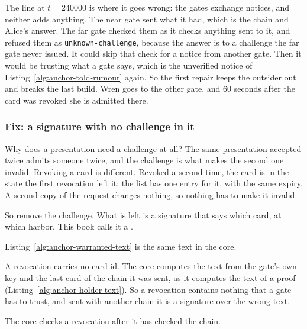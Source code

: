 The line at $t=240000$ is where it goes wrong: the gates exchange notices,
and neither adds anything. The near gate sent what it had, which is
the chain and Alice's answer. The far gate checked them as it checks
anything sent to it, and refused them as \texttt{unknown-challenge},
because the answer is to a challenge the far gate never issued. It could
skip that check for a notice from another gate. Then it would be trusting
what a gate says, which is the unverified notice of
Listing~\ref{alg:anchor-told-rumour} again.
So the first repair keeps the outsider out and breaks the last build. Wren
goes to the other gate, and 60 seconds after the card was revoked she
is admitted there.

\subsubsection{Fix: a signature with no challenge in it}

Why does a presentation need a challenge at all? The same presentation
accepted twice admits someone twice, and the challenge is what makes the
second one invalid. Revoking a card is different. Revoked a second time,
the card is in the state the first revocation left it: the list has one
entry for it, with the same expiry. A second copy of the request changes
nothing, so nothing has to make it invalid.

So remove the challenge. What is left is a signature that says which card,
at which harbor. This book calls it a .


Listing~\ref{alg:anchor-warranted-text} is the same text in the core.


A revocation carries no card id. The core computes the text from the gate's
own key and the last card of the chain it was sent, as it computes the text
of a proof (Listing~\ref{alg:anchor-holder-text}). So a revocation contains
nothing that a gate has to trust, and sent with another chain
it is a signature over the wrong text.

The core checks a revocation after it has checked the chain.


